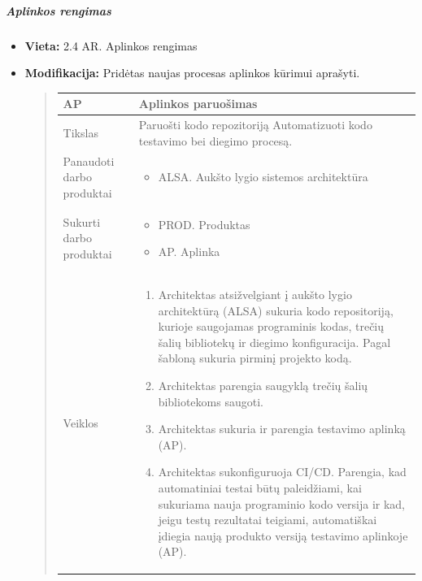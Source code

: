 \documentclass{article}
\begin{document}
\subparagraph{Aplinkos rengimas}
\begin{itemize}
    \item \textbf{Vieta:} 2.4 AR. Aplinkos rengimas 
    \item \textbf{Modifikacija:} Pridėtas naujas procesas aplinkos kūrimui aprašyti. 

    \begin{quote}
    \begin{longtable}{p{}|p{}}
        AP & Aplinkos paruošimas \\ \hline
        Tikslas & Paruošti kodo repozitoriją Automatizuoti kodo testavimo bei diegimo procesą. \\ \hline
        Panaudoti darbo produktai & \begin{itemize}
            \item ALSA. Aukšto lygio sistemos architektūra
        \end{itemize} \\ \hline
        Sukurti darbo produktai &
        \begin{itemize}
            \item PROD. Produktas
            \item AP. Aplinka
        \end{itemize}
        \\ \hline
        Veiklos & \begin{enumerate}
            \item Architektas atsižvelgiant į aukšto lygio architektūrą (ALSA) sukuria kodo repositoriją, kurioje saugojamas programinis kodas, trečių šalių bibliotekų ir diegimo konfiguracija. Pagal šabloną sukuria pirminį projekto kodą.
    
            \item Architektas parengia saugyklą trečių šalių bibliotekoms saugoti.
    
            \item Architektas sukuria ir parengia testavimo aplinką (AP).
    
            \item Architektas sukonfiguruoja CI/CD. Parengia, kad automatiniai testai būtų paleidžiami, kai sukuriama nauja programinio kodo versija ir kad, jeigu testų rezultatai teigiami, automatiškai įdiegia naują produkto versiją testavimo aplinkoje (AP).
       \end{enumerate}
    \end{longtable}
    \end{quote}
    
\end{itemize}
\end{document}
